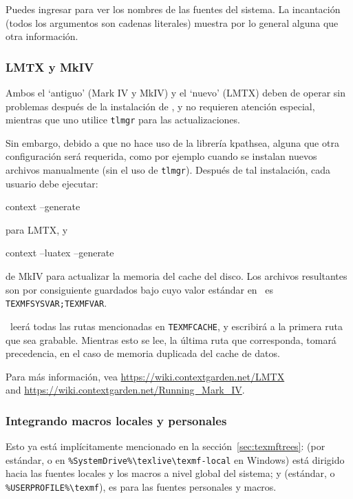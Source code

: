 \documentclass{article}
\begin{document}
Puedes ingresar  para ver los nombres de las fuentes del
sistema. La incantación 
(todos los argumentos son cadenas literales) muestra por lo general
alguna que otra información.

\subsubsection{\protect\ConTeXt{} LMTX y MkIV}
\label{sec:context-mkiv}

Ambos el `antiguo' \ConTeXt{} (Mark IV y MkIV) y el `nuevo' \ConTeXt{}
(LMTX) deben de operar sin problemas después de la
instalación de \TL{}, y no requieren atención especial, mientras que
uno utilice \verb+tlmgr+ para las actualizaciones. 

Sin embargo, debido a que \ConTeXt{} no hace uso
de la librería kpathsea, alguna que otra configuración será
requerida, como por ejemplo cuando se instalan nuevos
archivos manualmente (sin el uso de
\verb+tlmgr+). Después de tal instalación, cada usuario 
debe ejecutar:
\begin{sverbatim}
context --generate
\end{sverbatim}
para LMTX, y
\begin{sverbatim}
    context --luatex --generate
\end{sverbatim}
de MkIV para actualizar la memoria del cache del disco.  Los
archivos resultantes son por consiguiente guardados bajo
 cuyo valor estándar en \TL\ es
\verb+TEXMFSYSVAR;TEXMFVAR+.

\ConTeXt\ leerá todas las rutas mencionadas en
\verb+TEXMFCACHE+, y escribirá a la primera ruta que sea grabable.
Mientras esto se lee, la última ruta que corresponda, tomará precedencia,
en el caso de memoria duplicada del cache de datos.

Para más información, vea \url{https://wiki.contextgarden.net/LMTX}\\
and \url{https://wiki.contextgarden.net/Running_Mark_IV}.

\subsubsection{Integrando macros locales y personales}
\label{sec:local-personal-macros}

Esto ya está implícitamente mencionado en la
sección~\ref{sec:texmftrees}: 
 (por estándar,
 o en
\verb|%SystemDrive%\texlive\texmf-local| en Windows)
está dirigido hacia las fuentes locales y los macros a nivel global
del sistema; y  (estándar,  o
\verb|%USERPROFILE%\texmf|), es para las fuentes personales y macros.
\end{document}
